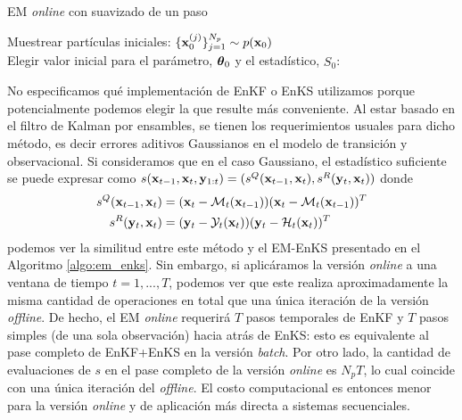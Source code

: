\begin{algorithm}[h]
\caption{EM \textit{online} con suavizado de un paso}
\label{algo:onlineEM_OSS}
    
    Muestrear partículas iniciales: $\{\mathbf{x}_0^{(j)}\}_{j=1}^{N_p} \sim p(\mathbf{x}_0)$ \\
    Elegir valor inicial para el parámetro, $\mbox{\boldmath$ \theta $}_0$ y el estadístico, $\widehat{S_0}$: \\
\end{algorithm}
No especificamos qué implementación de EnKF o EnKS utilizamos porque potencialmente podemos elegir la que resulte más conveniente. Al estar basado en el filtro de Kalman por ensambles, se tienen los requerimientos usuales para dicho método, es decir errores aditivos Gaussianos en el modelo de transición y observacional. Si consideramos que en el caso Gaussiano, el estadístico suficiente 
se puede expresar como $s(\mathbf{x}_{t-1}, \mathbf{x}_t, \mathbf{y}_{1:t}) = (s^Q(\mathbf{x}_{t-1}, \mathbf{x}_t), s^R(\mathbf{y}_t, \mathbf{x}_t))$ donde
\begin{align*}
    s^Q(\mathbf{x}_{t-1}, \mathbf{x}_t) &= (\mathbf{x}_t - \mathcal{M}_t(\mathbf{x}_{t-1}))(\mathbf{x}_t - \mathcal{M}_t(\mathbf{x}_{t-1}))^T \\
    s^R(\mathbf{y}_t, \mathbf{x}_t) &= (\mathbf{y}_t - \mathcal{Y}_t(\mathbf{x}_t))(\mathbf{y}_t - \mathcal{H}_t(\mathbf{x}_t))^T
\end{align*}
podemos ver la similitud entre este método y el EM-EnKS presentado en el Algoritmo \ref{algo:em_enks}. Sin embargo, si aplicáramos  la versión \textit{online} a una ventana de tiempo $t = 1, ..., T$, podemos ver que este realiza aproximadamente la misma cantidad de operaciones en total que una única iteración de la versión \textit{offline}. De hecho, el EM \textit{online} requerirá $T$ pasos temporales de EnKF y $T$ pasos simples (de una sola observación) hacia atrás de EnKS: esto es equivalente al pase completo de EnKF+EnKS en la versión \textit{batch}. Por otro lado, la cantidad de evaluaciones de $s$ en el pase completo de la versión \textit{online} es $N_p T$, lo cual coincide con una única iteración del \textit{offline}. El costo computacional es entonces menor para la versión \textit{online} y de aplicación más directa a sistemas secuenciales.


